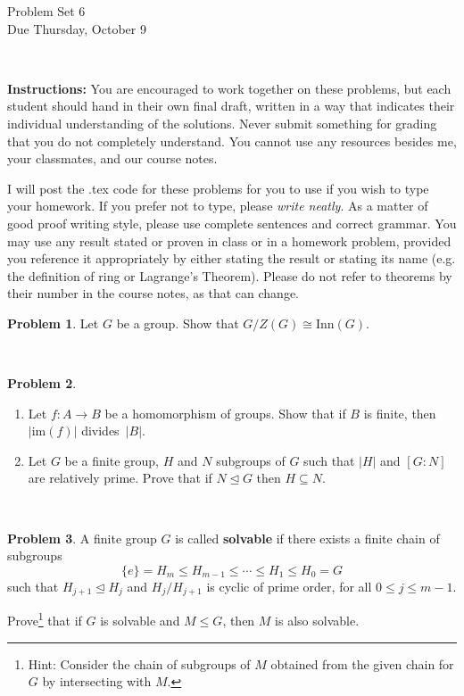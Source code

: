 \documentclass[11pt]{article}
\title{}
\date{\vspace{-0.5in}}
\theoremstyle{definition}
\newtheorem{problem}{Problem}
\begin{document}
\thispagestyle{fancy}
\pagestyle{fancy}

\vspace{3em}

\begin{center}
	{\LARGE Problem Set 6 \\}
	Due Thursday, October 9
\end{center}

\

\noindent
{\bf Instructions:}
You are encouraged to work together on these problems, but each student should hand in their own final draft, written in a way that indicates their individual understanding of the solutions. Never submit something for grading that you do not completely understand. You cannot use any resources besides me, your classmates, and our course notes.


I will post the .tex code for these problems for you to use if you wish to type your homework. If you prefer not to type, please  {\em write neatly}. As a matter of good proof writing style, please use complete sentences and correct grammar. You may use any result stated or proven in class or in a homework problem, provided you reference it appropriately by either stating the result or stating its name (e.g. the definition of ring or Lagrange's Theorem). Please do not refer to theorems by their number in the course notes, as that can change.


\smallskip

\begin{problem}
Let $G$ be a group. Show that $G/Z(G) \cong \mathrm{Inn}(G)$.
\end{problem}

\

\begin{problem} \phantom{ }
\begin{enumerate}[(2.1)]
\item Let $f:A \to B$ be a homomorphism of groups. Show that if $B$ is finite, then $|\mathrm{im}(f)|$ divides~$|B|$.
\item  Let $G$ be a finite group, $H$ and $N$ subgroups of $G$ such that $|H|$ and $[G : N]$ are relatively prime. Prove that if $N \trianglelefteq G$ then $H \subseteq N$.
\end{enumerate}
\end{problem}


\



\begin{problem} A finite group $G$ is called \textbf{solvable} if there exists a finite chain of subgroups
  $$
  \{e\} = H_m \leq H_{m-1} \leq \cdots \leq H_1 \leq H_0 = G
  $$
  such that $H_{j+1} \trianglelefteq H_j$ and $H_j/H_{j+1}$ is cyclic of prime order, for all $0 \leq j \leq m-1$. 

  Prove\footnote{Hint: Consider the chain  of subgroups of $M$ obtained from the given chain for $G$ by
    intersecting with $M$.} that if $G$ is solvable and $M \leq G$, then $M$ is also
  solvable.
    
    \end{problem}
    
\end{document}
